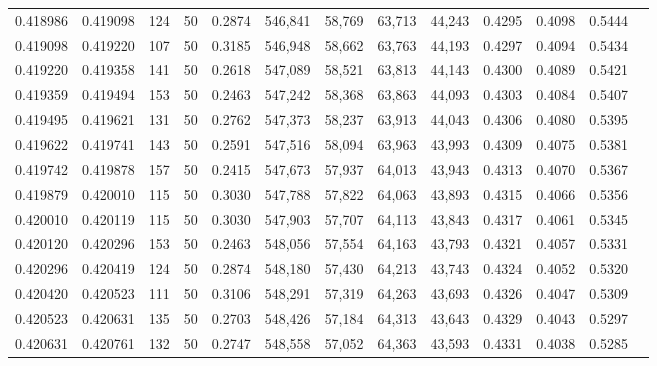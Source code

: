 \begin{tabular}{rrrrrrrrrrrrr}
0.418986 & 0.419098 &   124 &  50 &                                     0.2874 & 546,841 &  58,769 &  63,713 &  44,243 & 0.4295 & 0.4098 & 0.5444 \\
0.419098 & 0.419220 &   107 &  50 &                                     0.3185 & 546,948 &  58,662 &  63,763 &  44,193 & 0.4297 & 0.4094 & 0.5434 \\
0.419220 & 0.419358 &   141 &  50 &                                     0.2618 & 547,089 &  58,521 &  63,813 &  44,143 & 0.4300 & 0.4089 & 0.5421 \\
0.419359 & 0.419494 &   153 &  50 &                                     0.2463 & 547,242 &  58,368 &  63,863 &  44,093 & 0.4303 & 0.4084 & 0.5407 \\
0.419495 & 0.419621 &   131 &  50 &                                     0.2762 & 547,373 &  58,237 &  63,913 &  44,043 & 0.4306 & 0.4080 & 0.5395 \\
0.419622 & 0.419741 &   143 &  50 &                                     0.2591 & 547,516 &  58,094 &  63,963 &  43,993 & 0.4309 & 0.4075 & 0.5381 \\
0.419742 & 0.419878 &   157 &  50 &                                     0.2415 & 547,673 &  57,937 &  64,013 &  43,943 & 0.4313 & 0.4070 & 0.5367 \\
0.419879 & 0.420010 &   115 &  50 &                                     0.3030 & 547,788 &  57,822 &  64,063 &  43,893 & 0.4315 & 0.4066 & 0.5356 \\
0.420010 & 0.420119 &   115 &  50 &                                     0.3030 & 547,903 &  57,707 &  64,113 &  43,843 & 0.4317 & 0.4061 & 0.5345 \\
0.420120 & 0.420296 &   153 &  50 &                                     0.2463 & 548,056 &  57,554 &  64,163 &  43,793 & 0.4321 & 0.4057 & 0.5331 \\
0.420296 & 0.420419 &   124 &  50 &                                     0.2874 & 548,180 &  57,430 &  64,213 &  43,743 & 0.4324 & 0.4052 & 0.5320 \\
0.420420 & 0.420523 &   111 &  50 &                                     0.3106 & 548,291 &  57,319 &  64,263 &  43,693 & 0.4326 & 0.4047 & 0.5309 \\
0.420523 & 0.420631 &   135 &  50 &                                     0.2703 & 548,426 &  57,184 &  64,313 &  43,643 & 0.4329 & 0.4043 & 0.5297 \\
0.420631 & 0.420761 &   132 &  50 &                                     0.2747 & 548,558 &  57,052 &  64,363 &  43,593 & 0.4331 & 0.4038 & 0.5285 \\

\end{tabular}
